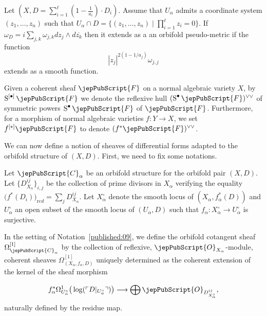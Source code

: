 \begin{remark}
Let $(X, D =\sum_{i=1}^\ell (1-\frac{1}{a_i})\cdot D_i)$. Assume that $U_{\alpha}$ admits a coordinate system $(z_1, \ldots, z_n)$ such that $U_{\alpha}\cap D = \{ (z_1, \ldots, z_n) \; \big| \;  \prod_{i=1}^\ell z_i =0   \}$. If $\omega_D=i\sum_{j,k} \omega_{j,k} dz_j \wedge d\overline{z_k}$ then it extends as a an orbifold pseudo-metric if the function $$|z_j|^{2(1-1/a_j)}\omega_{j,j}$$ extends as a smooth function.
\end{remark}

\begin{notation}
Given a coherent sheaf $\jepPubScript{F}$ on a normal algebraic variety $X$, by $\operatorname{S} ^{[\bullet]}\jepPubScript{F}$
we denote the reflexive hull $(\operatorname{S}^{\bullet}\jepPubScript{F})^{\vee\vee}$ of symmetric powers 
$\operatorname{S}^{\bullet}\jepPubScript{F}$ of $\jepPubScript{F}$. Furthermore, for a morphism of normal 
algebraic varieties $f: Y \to X$, we set $f^{[*]}\jepPubScript{F}$ to denote $(f^*\jepPubScript{F})^{\vee \vee}$.

\end{notation}

We can now define a notion of sheaves of differential forms adapted to the orbifold 
structure of $(X,D)$. First, we need to fix some notations. 

\begin{notation}\label{published:09}
Let $\jepPubScript{C}_{\alpha}$ be an orbifold structure for the orbifold pair $(X,D)$.
Let $\{ D_{X_{\alpha}}^{ij} \}_{i, j}$ be the collection of prime divisors in $X_{\alpha}$ verifying the 
equality $\bigl(f^*(D_i)\bigr)_{\mathrm red}= \sum_j  D^{ij}_{X_{\alpha}}$. 
Let $X_{\alpha}^\circ$ denote the smooth locus of 
$(X_{\alpha}, f_{\alpha}^*(D))$ and $U_{\alpha}^\circ$ an open subset of 
the smooth locus of $(U_{\alpha}, D)$ such that $f_{\alpha}: X_{\alpha}^\circ\to U_{\alpha}^\circ$ is surjective.
\end{notation}

\begin{definition}\label{published:10}
In the setting of Notation~\ref{published:09}, we define the 
orbifold cotangent sheaf $\Omega_{\jepPubScript{C}_{\alpha}}^{[1]}$ by the collection 
of reflexive, $\jepPubScript{O}_{X_{\alpha}}$-module, coherent sheaves $\Omega^{[1]}_{(X_{\alpha}, f_{\alpha}, D)}$ 
uniquely determined as the coherent extension of the 
kernel of the sheaf morphism 

$$
f_{\alpha}^*\Omega^1_{U_{\alpha}^\circ} \big(  \log ( \ulcorner D   |_{U_{\alpha}^\circ} \urcorner) \big) 
   \longrightarrow \bigoplus \jepPubScript{O}_{D_{X_{\alpha}^\circ}^{ij}},
$$
naturally defined by the residue map. 
\end{definition}

